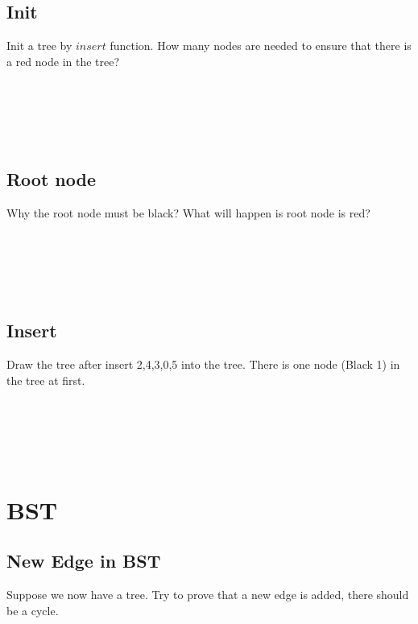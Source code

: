 \documentclass[11pt]{exam}
\begin{document}
\subsection{Init}
Init a tree by $insert$ function. How many nodes are needed to ensure that there is a red node in the tree?
\begin{solution}
    \\ \hspace*{\fill} \\
    \\ \hspace*{\fill} \\
   
\end{solution}
\subsection{Root node}
Why the root node must be black? What will happen is root node is red?
\begin{solution}
    \\ \hspace*{\fill} \\
    \\ \hspace*{\fill} \\

\end{solution}
    
\subsection{Insert}
Draw the tree after insert 2,4,3,0,5 into the tree. There is one node (Black 1) in the tree at first.
\begin{solution}
    \\ \hspace*{\fill} \\
    \\ \hspace*{\fill} \\
    
\end{solution}

\section{BST}
    \subsection{New Edge in BST}
    Suppose we now have a tree. Try to prove that a new edge is added, there should be a cycle.\par 
    \begin{solution}
        \\ \hspace*{\fill} \\
        \\ \hspace*{\fill} \\
       
    \end{solution}
\end{document}
